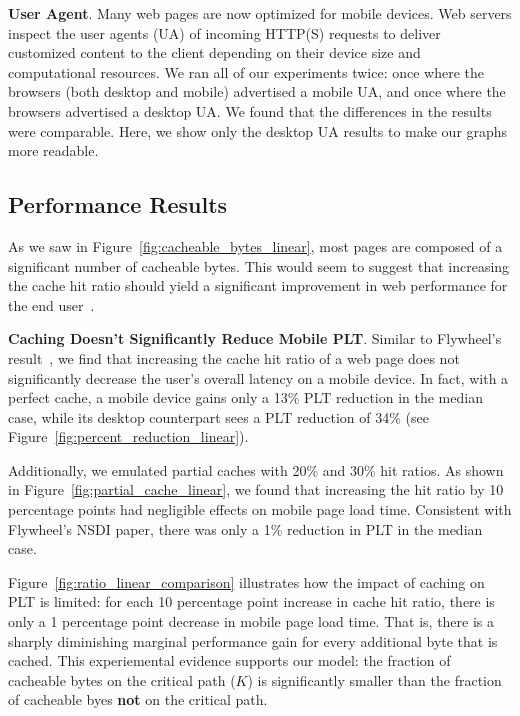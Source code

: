 \textbf{User Agent}. Many web pages are now optimized for mobile devices. Web
servers inspect the user agents (UA) of incoming HTTP(S) requests to deliver
customized content to the client depending on their device size and
computational resources. We ran all of our experiments twice: once where the
browsers (both desktop and mobile) advertised a mobile UA, and once where the
browsers advertised a desktop UA. We found that the differences in the results
were comparable. Here, we show only the desktop UA results to make our graphs more readable.

\subsection{Performance Results}

As we saw in Figure~\ref{fig:cacheable_bytes_linear}, most pages are composed of a significant number of cacheable bytes. This would seem to suggest that increasing the cache hit ratio should yield a significant improvement in web performance for the end user~\cite{kroeger1997exploring}.

\textbf{Caching Doesn't Significantly Reduce Mobile PLT}.
Similar to Flywheel's result~\cite{flywheel}, we find that increasing the cache hit ratio of a web page does not significantly decrease the user's overall latency on a mobile device.
In fact, with a perfect cache, a mobile device gains only a 13\% PLT reduction in the median case, while its desktop counterpart sees a  PLT reduction of 34\% (see Figure~\ref{fig:percent_reduction_linear}).

Additionally, we emulated partial caches with 20\% and 30\% hit ratios. As shown in Figure~\ref{fig:partial_cache_linear}, we found that increasing the hit ratio by 10 percentage points had negligible effects on mobile page load time. Consistent with Flywheel's NSDI paper, there was only a 1\% reduction in PLT in the median case.

Figure~\ref{fig:ratio_linear_comparison} illustrates how the impact of caching on PLT is limited:
for each 10 percentage point increase in cache hit ratio, there is only a 1 percentage point decrease in mobile page load time.
That is, there is a sharply diminishing marginal performance gain for every additional byte that is cached.
This experiemental evidence supports our model:
the fraction of cacheable bytes on the critical path ($K$) is significantly smaller than the fraction of cacheable byes \textbf{not} on the critical path.

